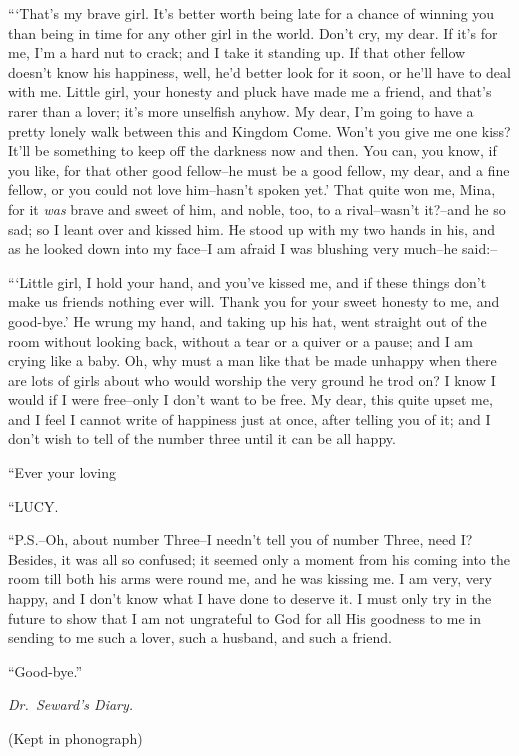 \documentclass[12pt,openright]{book}
\begin{document}
“‘That’s my brave girl. It’s better worth being late for a chance of winning you than being in time for any other girl in the world. Don’t cry, my dear. If it’s for me, I’m a hard nut to crack; and I take it standing up. If that other fellow doesn’t know his happiness, well, he’d better look for it soon, or he’ll have to deal with me. Little girl, your honesty and pluck have made me a friend, and that’s rarer than a lover; it’s more unselfish anyhow. My dear, I’m going to have a pretty lonely walk between this and Kingdom Come. Won’t you give me one kiss? It’ll be something to keep off the darkness now and then. You can, you know, if you like, for that other good fellow–he must be a good fellow, my dear, and a fine fellow, or you could not love him–hasn’t spoken yet.’ That quite won me, Mina, for it \textit{was} brave and sweet of him, and noble, too, to a rival–wasn’t it?–and he so sad; so I leant over and kissed him. He stood up with my two hands in his, and as he looked down into my face–I am afraid I was blushing very much–he said:–

“‘Little girl, I hold your hand, and you’ve kissed me, and if these things don’t make us friends nothing ever will. Thank you for your sweet honesty to me, and good-bye.’ He wrung my hand, and taking up his hat, went straight out of the room without looking back, without a tear or a quiver or a pause; and I am crying like a baby. Oh, why must a man like that be made unhappy when there are lots of girls about who would worship the very ground he trod on? I know I would if I were free–only I don’t want to be free. My dear, this quite upset me, and I feel I cannot write of happiness just at once, after telling you of it; and I don’t wish to tell of the number three until it can be all happy.

“Ever your loving

“LUCY.

“P.S.–Oh, about number Three–I needn’t tell you of number Three, need I? Besides, it was all so confused; it seemed only a moment from his coming into the room till both his arms were round me, and he was kissing me. I am very, very happy, and I don’t know what I have done to deserve it. I must only try in the future to show that I am not ungrateful to God for all His goodness to me in sending to me such a lover, such a husband, and such a friend.

“Good-bye.”

\textit{Dr. Seward’s Diary.}

(Kept in phonograph)
\end{document}
